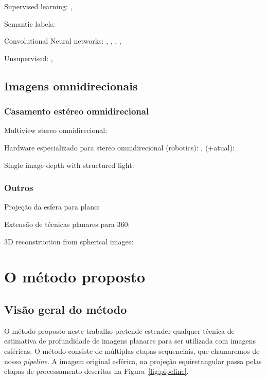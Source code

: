 \documentclass[cic,tc]{iiufrgs}
\begin{document}
Supervised learning: \citet{Saxena2005}, \citet{Saxena2008}

Semantic labels: \citet{Liu2010}

Convolutional Neural networks: 
\citet{Fayao2015}, \citet{Eigen2014}, \citet{Eigen2015}, \citet{Kuznietsov2017}, \citet{Li2017}

Unsupervised: \citet{Godard2016}, \citet{Zhou2017}


\section{Imagens omnidirecionais}

\subsection{Casamento estéreo omnidirecional}
Multiview stereo omnidirecional: \citet{Li2001}

Hardware especializado para stereo omnidirecional (robotics): \citet{gluckman1998}, \citet{Koyasu2001} (+atual): \citet{Lin2014}

Single image depth with structured light: \citet{Orghidan2005}

\subsection{Outros}
Projeção da esfera para plano: \citet{sun360}

Extensão de técnicas planares para 360: \citet{flat2sphere}

3D reconstruction from spherical images: \citet{panoContext}

\chapter{O método proposto}

\section{Visão geral do método}

O método proposto neste trabalho pretende estender qualquer técnica de estimativa de profundidade de imagens planares para ser utilizada com imagens esféricas. O método consiste de múltiplas etapas sequenciais, que chamaremos de nosso \textit{pipeline}. A imagem original esférica, na projeção equiretangular passa pelas etapas de processamento descritas na Figura~\ref{fig:pipeline}.
\end{document}
